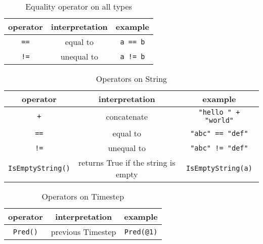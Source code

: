 \documentclass[12pt]{article}
\begin{document}
\begin{table}[H]
\centering
\caption{Equality operator on all types}
\begin{tabular}{ c c c }
\toprule 
operator & interpretation & example \\
\midrule
{\tt ==} & equal to & \verb|a == b|   \\ 
{\tt !=} & unequal to & \verb|a != b|  \\ 
\bottomrule
\end{tabular}
\end{table}

\begin{table}[H]
\centering
\caption{Operators on String}
\begin{tabular}{ c c c }
\toprule 
operator & interpretation & example \\
\midrule
{\tt +} & concatenate & \verb|"hello " + "world"|  \\ 
{\tt ==} & equal to & \verb|"abc" == "def"|  \\
{\tt !=} & unequal to & \verb|"abc" != "def"|\\ 
\verb|IsEmptyString()| & returns True if the string is empty & \verb|IsEmptyString(a)| \\
\bottomrule
\end{tabular}
\end{table}

\begin{table}[H]
\centering
\caption{Operators on Timestep}
\begin{tabular}{ c c c }
\toprule 
operator & interpretation & example \\
\midrule
\verb|Pred()| & previous Timestep & \verb|Pred(@1)|  \\
\bottomrule
\end{tabular}
\end{table}
\end{document}
